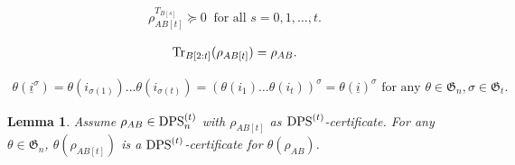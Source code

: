 \documentclass[10pt,a4paper]{amsart}
\newtheorem{lemma}{Lemma}
\newcommand{\DPS}{\text{\rm DPS}}
\newcommand{\ML}{\textcolor{blue}}
\newcommand{\Perm}{\mathfrak G}
\newcommand{\Tr}{\text{\rm Tr}}
\newcommand{\ui}{\underline{i}}
\begin{document}
\begin{align}\label{eq:DPS2}
\rho_{AB[t]}^{T_{B[s]}}\succeq 0  \ \text{ for all } s=0,1,\ldots,t.
\end{align}

\begin{align}\label{eq:DPS3}
\Tr_{B[2:t]}(\rho_{AB[t]}) = \rho_{AB}.
\end{align}

\begin{align}\label{eq:theta-sigma}
\theta(\ui^\sigma) =\theta(i_{\sigma(1)})\ldots\theta(i_{\sigma(t)})= (\theta(i_1)\ldots\theta(i_t))^\sigma=\theta(\ui)^\sigma \text{ for any } \theta\in\Perm_n, \sigma\in \Perm_t.
\end{align}

\begin{lemma}\label{LThetaAppliedDPSLCertificate}
 Assume $\rho_{AB}\in \DPS^{(t)}_n$ with $\rho_{AB[t]}$ as $\DPS^{(t)}$-certificate.
For any $\theta\in \Perm_n$,  $\theta(\rho_{AB[t]}) $ is a $\DPS^{(t)}$-certificate for $\theta(\rho_{AB})$.
\end{lemma}
\end{document}
